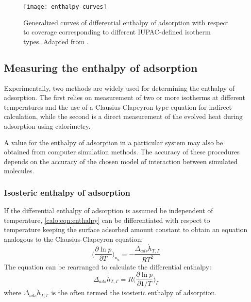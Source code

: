 \begin{figure}[htb]
  \centering

  \texttt{[image: enthalpy-curves]}
  \caption{
    Generalized curves of differential enthalpy of adsorption with 
    respect to coverage corresponding to different 
    IUPAC-defined isotherm types.
    Adapted from \citeauthor{llewellynGasAdsorptionMicrocalorimetry2005}%
    \cite{llewellynGasAdsorptionMicrocalorimetry2005}.
  }%
  \label{calo:fig:enthalpy-iupac-iso}

\end{figure}


\subsection{Measuring the enthalpy of adsorption}

Experimentally, two methods are widely used for determining the 
enthalpy of adsorption. The first relies on measurement of two 
or more isotherms at different temperatures and the use of 
a Clausius-Clapeyron-type equation for indirect calculation, 
while the second is a direct measurement of the evolved heat
during adsorption using calorimetry.

A value for the enthalpy of adsorption in a particular system
may also be obtained from computer simulation methods. 
The accuracy of these procedures depends on the accuracy of
the chosen model of interaction between simulated molecules.

\subsubsection{Isosteric enthalpy of adsorption}

If the differential enthalpy of adsorption is assumed be independent
of temperature, \autoref{calo:eqn:enthalpy} can be differentiated 
with respect to temperature keeping the surface adsorbed amount constant
to obtain an equation analogous to the Clausius-Clapeyron equation:
%
\begin{equation}
    \Big( \frac{\partial \ln p}{\partial T} \Big)_{n_a} = -\frac{\Delta_{ads}\dot{h}_{T, \Gamma}}{R T^2}
\end{equation}
%
The equation can be rearranged to calculate the differential enthalpy:
%
\begin{equation}\label{calo:eqn:claus-clap}
  \Delta_{ads}\dot{h}_{T, \Gamma} = R \Big( \frac{\partial \ln p}{\partial 1 / T} \Big)_{\Gamma}
\end{equation}
%
where \(\Delta_{ads}\dot{h}_{T, \Gamma}\) is the often termed the 
isosteric enthalpy of adsorption.

